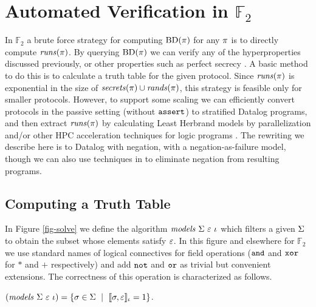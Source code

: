 \section{Automated Verification in $\mathbb{F}_2$}
\label{section-bruteforce}

In $\mathbb{F}_2$ a brute force strategy for computing
$\mathrm{BD}(\pi)$ for any $\pi$ is to directly compute
$\mathit{runs}(\pi)$. By querying $\mathrm{BD}(\pi)$ we can verify any of the
hyperproperties discussed previously, or other properties such as
perfect secrecy \cite{XXX}.  A basic method to do this is
to calculate a truth table for the given protocol. Since
$\mathit{runs}(\pi)$ is exponential in
the size of $\mathit{secrets}(\pi) \cup \mathit{rands}(\pi)$, this strategy is
feasible only for smaller protocols. However, to support some
scaling we can efficiently
convert protocols in the passive setting (without $\texttt{assert}$) to
stratified Datalog programs, and then extract $\mathit{runs}(\pi)$ by
calculating Least Herbrand models by parallelization and/or other HPC
acceleration techniques for logic programs \cite{aspis2018linear}.
The rewriting we describe here is to Datalog with negation, with a
negation-as-failure model, though we can also use techniques in
\cite{sakama2017linear} to eliminate negation from resulting programs.

\subsection{Computing a Truth Table}

In Figure \ref{fig-solve} we define the algorithm
$\mathit{models}\ \Sigma\ \varepsilon\ \iota$ which filters a given $\Sigma$ to obtain the
subset whose elements satisfy $\varepsilon$. In this figure and elsewhere for
$\mathbb{F}_2$ we use standard names of logical connectives
for field operations ($\texttt{and}$ and $\texttt{xor}$ for $*$ and $+$ respectively) and
add $\texttt{not}$ and $\texttt{or}$ as trivial but convenient extensions. The correctness
of this operation is characterized as follows.
\begin{lemma}
  \label{lemma-solves}
  $(\mathit{models}\ \Sigma\ \varepsilon\ \iota) = \{ \sigma \in \Sigma \ \mid\ \llbracket \sigma,\varepsilon \rrbracket_{\iota} = 1 \}$.
\end{lemma}

\solvefig

